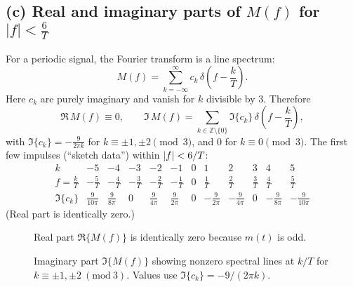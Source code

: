 \documentclass[11pt]{article}
\begin{document}
\subsection*{(c) Real and imaginary parts of $M(f)$ for $|f|<\tfrac{6}{T}$}
For a periodic signal, the Fourier transform is a line spectrum:
\[
M(f)=\sum_{k=-\infty}^{\infty} c_k\,\delta\!\left(f-\frac{k}{T}\right).
\]
Here $c_k$ are purely imaginary and vanish for $k$ divisible by $3$. Therefore
\[
\Re\,M(f)\equiv 0,\qquad
\Im\,M(f)=\sum_{k\in\mathbb{Z}\setminus\{0\}}\Im\{c_k\}\,\delta\!\left(f-\frac{k}{T}\right),
\]
with $\Im\{c_k\}=-\frac{9}{2\pi k}$ for $k\equiv\pm1,\pm2\pmod 3$, and $0$ for $k\equiv 0\pmod 3$.
The first few impulses (``sketch data'') within $\abs{f}<6/T$:
\[
\begin{array}{c|ccccccccccc}
k & -5 & -4 & -3 & -2 & -1 & 0 & 1 & 2 & 3 & 4 & 5\\\hline
f=\tfrac{k}{T} & -\tfrac{5}{T}&-\tfrac{4}{T}&-\tfrac{3}{T}&-\tfrac{2}{T}&-\tfrac{1}{T}&0&
\tfrac{1}{T}&\tfrac{2}{T}&\tfrac{3}{T}&\tfrac{4}{T}&\tfrac{5}{T}\\
\Im\{c_k\} & \tfrac{9}{10\pi} & \tfrac{9}{8\pi} & 0 & \tfrac{9}{4\pi} & \tfrac{9}{2\pi} & 0 &
-\tfrac{9}{2\pi} & -\tfrac{9}{4\pi} & 0 & -\tfrac{9}{8\pi} & -\tfrac{9}{10\pi}
\end{array}
\]
(Real part is identically zero.)

\begin{figure}[H]
\centering
{}
\caption{Real part $\Re\{M(f)\}$ is identically zero because $m(t)$ is odd.}
\end{figure}

\begin{figure}[H]
\centering
{}
\caption{Imaginary part $\Im\{M(f)\}$ showing nonzero spectral lines at $k/T$ for $k\equiv \pm1,\pm2\ (\mathrm{mod}\ 3)$. Values use $\Im\{c_k\}=-9/(2\pi k)$.}
\end{figure}
\end{document}
